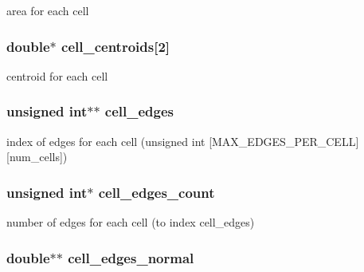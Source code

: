 area for each cell 

\hypertarget{structFVL_1_1CFVMesh2D_1_1CFVMesh2D__cuda_a05beb562a8dc14ea92dd8cc7b36f5131}{
\subsubsection[{cell\_\-centroids}]{\setlength{\rightskip}{0pt plus 5cm}double$\ast$ {\bf cell\_\-centroids}\mbox{[}2\mbox{]}}}
\label{d6/d30/structFVL_1_1CFVMesh2D_1_1CFVMesh2D__cuda_a05beb562a8dc14ea92dd8cc7b36f5131}


centroid for each cell 

\hypertarget{structFVL_1_1CFVMesh2D_1_1CFVMesh2D__cuda_a618dbcd16053ddd3695a69d156f9caea}{
\subsubsection[{cell\_\-edges}]{\setlength{\rightskip}{0pt plus 5cm}unsigned int$\ast$$\ast$ {\bf cell\_\-edges}}}
\label{d6/d30/structFVL_1_1CFVMesh2D_1_1CFVMesh2D__cuda_a618dbcd16053ddd3695a69d156f9caea}


index of edges for each cell (unsigned int \mbox{[}MAX\_\-EDGES\_\-PER\_\-CELL\mbox{]}\mbox{[}num\_\-cells\mbox{]}) 

\hypertarget{structFVL_1_1CFVMesh2D_1_1CFVMesh2D__cuda_a0272dc8071de98dff11b0109af7bdbed}{
\subsubsection[{cell\_\-edges\_\-count}]{\setlength{\rightskip}{0pt plus 5cm}unsigned int$\ast$ {\bf cell\_\-edges\_\-count}}}
\label{d6/d30/structFVL_1_1CFVMesh2D_1_1CFVMesh2D__cuda_a0272dc8071de98dff11b0109af7bdbed}


number of edges for each cell (to index cell\_\-edges) 

\hypertarget{structFVL_1_1CFVMesh2D_1_1CFVMesh2D__cuda_a8f355297b336ee7533f50e27b552216e}{
\subsubsection[{cell\_\-edges\_\-normal}]{\setlength{\rightskip}{0pt plus 5cm}double$\ast$$\ast$ {\bf cell\_\-edges\_\-normal}}}
\label{d6/d30/structFVL_1_1CFVMesh2D_1_1CFVMesh2D__cuda_a8f355297b336ee7533f50e27b552216e}


